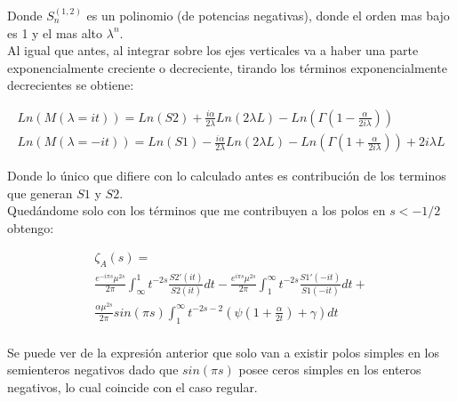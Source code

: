 Donde $S _n ^{(1,2)}$ es un polinomio (de potencias negativas), donde el orden mas bajo es 1 y el mas alto $\lambda ^n$. \\


Al igual que antes, al integrar sobre los ejes verticales va a haber una parte exponencialmente creciente o decreciente, tirando los términos exponencialmente decrecientes se obtiene:

\begin{equation}
\begin{array}{c}

Ln ( M ( \lambda = i t ) ) =  Ln(S2) + 
\frac{i \alpha }{2 \lambda} Ln(2 \lambda L) - 
Ln( \Gamma( 1 - \frac{ \alpha}{2 i \lambda} ) ) \\ 

Ln( M ( \lambda = -i t ) ) = Ln(S1) -  
\frac{i \alpha }{2 \lambda} Ln( 2 \lambda L ) - 
Ln( \Gamma ( 1 + \frac{ \alpha}{2 i \lambda} )) +
2 i \lambda L 

\end{array}
\end{equation}

Donde lo único que difiere con lo calculado antes es contribución de los terminos que generan $S1$ y $S2$. \\




Quedándome solo con los términos que me contribuyen a los polos en  $s < -1/2$ obtengo:

\begin{equation}
\begin{array}{c}
 \zeta _A (s) = \\ [10pt]
\frac{e ^{- i \pi s} \mu ^{2s } }{2 \pi}
\int _{\infty} ^{1} t ^{-2s } 
		\frac{S2' (it)}{S2 (it)}
		d t
	- 
\frac{e ^{i \pi s} \mu ^{2s}}{2 \pi}
\int _{1} ^{\infty} t ^{-2s } 
	\frac{S1' (-it)}{S1(-it)}
	d t +
	 \\ [10pt]
	\frac{\alpha \mu ^{2s} }{2 \pi }	sin( \pi s)  \int _1 ^{\infty}
	t ^{-2s-2} \left( \psi \left( 1 + \frac{\alpha}{2 t}\right) + \gamma \right) dt \\[15pt]


\end{array}
\end{equation}




Se puede ver de la expresión anterior que solo van a existir polos simples en los semienteros negativos dado que $sin(\pi s)$ posee ceros simples en los enteros negativos, lo cual coincide con el caso regular.

